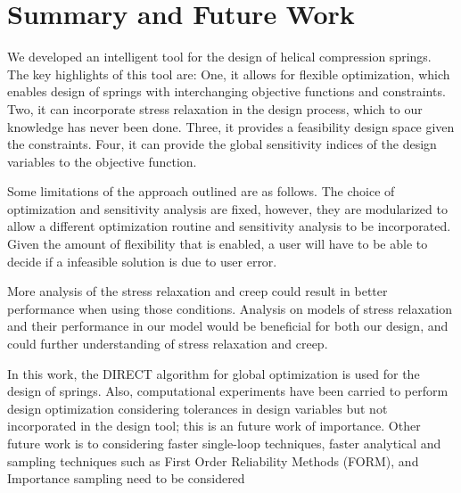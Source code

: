 \documentclass[10pt]{article}
\begin{document}
%
%

\section{Summary and Future Work}
\label{sec:Summary}

We developed an intelligent tool for the design of helical compression springs. The key highlights of this tool are: One, it allows for flexible optimization, which enables design of springs with interchanging objective functions and constraints. Two, it can incorporate stress relaxation in the design process, which to our knowledge has never been done. Three, it provides a feasibility design space given the constraints. Four, it can provide the global sensitivity indices of the design variables to the objective function. 

Some limitations of the approach outlined are as follows. The choice of optimization and sensitivity analysis are fixed, however, they are modularized to allow a different optimization routine and sensitivity analysis to be incorporated. Given the amount of flexibility that is enabled, a user will have to be able to decide if a infeasible solution is due to user error. 

More analysis of the stress relaxation and creep could result in better performance when using those conditions. Analysis on models of stress relaxation and their performance in our model would be beneficial for both our design, and could further understanding of stress relaxation and creep.

In this work, the DIRECT algorithm for global optimization is used for the design of springs. Also, computational experiments have been carried to perform design optimization considering tolerances in design variables but not incorporated in the design tool; this is an future work of importance. Other future work is to considering faster single-loop techniques, faster analytical and sampling techniques such as First Order Reliability Methods (FORM), and Importance sampling need to be considered
\end{document}
